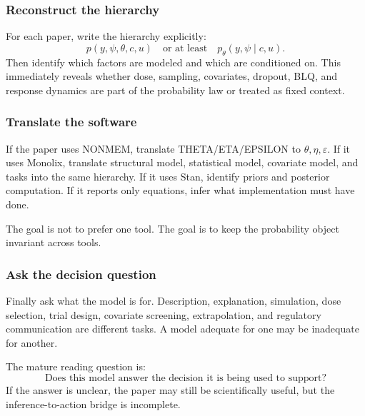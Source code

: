 \subsubsection*{Reconstruct the hierarchy}

For each paper, write the hierarchy explicitly:
\[
  p(y,\psi,\theta,c,u)
  \quad\text{or at least}\quad
  p_\theta(y,\psi\mid c,u).
\]
Then identify which factors are modeled and which are conditioned on.  This immediately reveals whether dose, sampling, covariates, dropout, BLQ, and response dynamics are part of the probability law or treated as fixed context.

\subsubsection*{Translate the software}

If the paper uses NONMEM, translate THETA/ETA/EPSILON to \(\theta,\eta,\varepsilon\).  If it uses Monolix, translate structural model, statistical model, covariate model, and tasks into the same hierarchy.  If it uses Stan, identify priors and posterior computation.  If it reports only equations, infer what implementation must have done.

The goal is not to prefer one tool.  The goal is to keep the probability object invariant across tools.

\subsubsection*{Ask the decision question}

Finally ask what the model is for.  Description, explanation, simulation, dose selection, trial design, covariate screening, extrapolation, and regulatory communication are different tasks.  A model adequate for one may be inadequate for another.

The mature reading question is:
\[
  \text{Does this model answer the decision it is being used to support?}
\]
If the answer is unclear, the paper may still be scientifically useful, but the inference-to-action bridge is incomplete.
